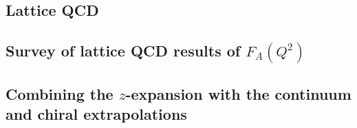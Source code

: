 \subsection{Lattice QCD\label{sec:lqcd_intro}}



\subsection{Survey of lattice QCD results of $F_A(Q^2)$\label{sec:lqcd_results}}


\subsection{Combining the $z$-expansion with the continuum and chiral extrapolations\label{sec:z_continuum}}


